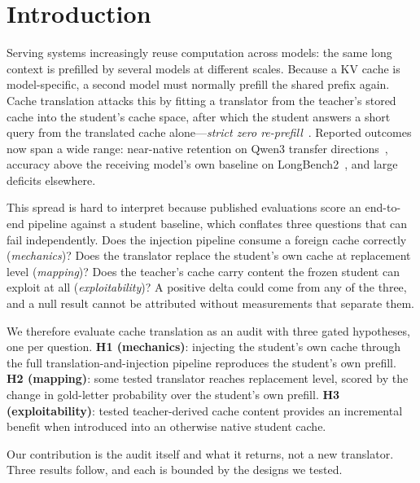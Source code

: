 \documentclass{article} %
\newcommand{\kv}{\ensuremath{\mathrm{KV}}}
\begin{document}

\section{Introduction}
\label{sec:intro}

Serving systems increasingly reuse computation across models: the same long
context is prefilled by several models at different scales. Because a \kv{}
cache is model-specific, a second model must normally prefill the shared prefix
again. Cache translation attacks this by fitting a translator from the teacher's
stored cache into the student's cache space, after which the student answers a short
query from the translated cache alone---\emph{strict zero
re-prefill}~\citep{c2c2025,lsc2026,mot2026,heo2026,cachebridge2026,contextreuse2026}.
Reported outcomes now span a wide range: near-native retention on Qwen3
transfer directions~\citep{cachebridge2026}, accuracy above the receiving
model's own baseline on LongBench2~\citep{contextreuse2026}, and large deficits
elsewhere.

This spread is hard to interpret because published evaluations score an
end-to-end pipeline against a student baseline, which conflates three questions
that can fail independently. Does the injection pipeline consume a foreign
cache correctly (\emph{mechanics})? Does the translator replace the student's own cache
at replacement level (\emph{mapping})? Does the teacher's cache carry content
the frozen student can exploit at all (\emph{exploitability})? A positive delta
could come from any of the three, and a null result cannot be attributed
without measurements that separate them.

We therefore evaluate cache translation as an audit with three gated
hypotheses, one per question.
\textbf{H1 (mechanics)}: injecting the student's own cache through the full
translation-and-injection pipeline reproduces the student's own prefill.
\textbf{H2 (mapping)}: some tested translator reaches replacement level, scored
by the change in gold-letter probability over the student's own prefill.
\textbf{H3 (exploitability)}: tested teacher-derived cache content provides an
incremental benefit when introduced into an otherwise native student cache.

Our contribution is the audit itself and what it returns, not a new translator.
Three results follow, and each is bounded by the designs we tested.
\end{document}
